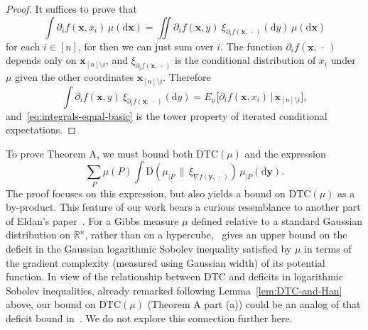 \documentclass[aop,preprint]{imsart}
\theoremstyle{remark}
\newtheorem*{rmk}{Remark}
\renewcommand{\bf}[1]{\boldsymbol{#1}}
\newcommand{\bbR}{\mathbb{R}}
\renewcommand{\d}{\mathrm{d}}
\newcommand{\DTC}{\mathrm{DTC}}
\newcommand{\rmD}{\mathrm{D}}
\begin{document}
\begin{proof}
	It suffices to prove that
	\begin{equation}\label{eq:integrals-equal-basic}
	\int \partial_if(\bf{x},x_i)\,\mu(\d \bf{x}) = \iint \partial_i f(\bf{x},y)\ \xi_{\partial_if(\bf{x},\,\cdot\,)}(\d y)\,\mu(\d \bf{x})
	\end{equation}
for each $i\in [n]$, for then we can just sum over $i$. The function $\partial_if(\bf{x},\,\cdot\,)$ depends only on $\bf{x}_{[n]\setminus i}$, and $\xi_{\partial_if(\bf{x},\,\cdot\,)}$ is the conditional distribution of $x_i$ under $\mu$ given the other coordinates $\bf{x}_{[n]\setminus i}$. Therefore
	\[\int \partial_i f(\bf{x},y)\ \xi_{\partial_if(\bf{x},\,\cdot\,)}(\d y) = E_\mu\big[\partial_if(\bf{x},x_i)\,\big|\,\bf{x}_{[n]\setminus i}\big],\]
	and~\eqref{eq:integrals-equal-basic} is the tower property of iterated conditional expectations.
\end{proof}


To prove Theorem A, we must bound both $\DTC(\mu)$ and the expression
\begin{equation}\label{eq:ave-trans}
\sum_P\mu(P)\int \rmD(\mu_{|P}\,\|\,\xi_{\nabla f(\bf{y},\,\cdot\,)})\,\mu_{|P}(\d\bf{y}).
\end{equation}
The proof focuses on this expression, but also yields a bound on $\DTC(\mu)$ as a by-product.  This feature of our work bears a curious resemblance to another part of Eldan's paper~\cite{Eld--GWcomp}.  For a Gibbs measure $\mu$ defined relative to a standard Gaussian distribution on $\bbR^n$, rather than on a hypercube,~\cite[Theorem 4]{Eld--GWcomp} gives an upper bound on the deficit in the Gaussian logarithmic Sobolev inequality satisfied by $\mu$ in terms of the gradient complexity (measured using Gaussian width) of its potential function. In view of the relationship between $\DTC$ and deficits in logarithmic Sobolev inequalities, already remarked following Lemma~\ref{lem:DTC-and-Han} above, our bound on $\DTC(\mu)$ (Theorem A part (a)) could be an analog of that deficit bound in~\cite{Eld--GWcomp}.  We do not explore this connection further here.
\end{document}

